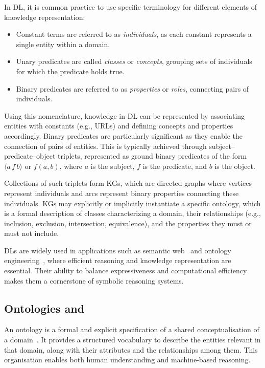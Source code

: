 In \gls{DL}, it is common practice to use specific terminology for different elements of knowledge representation:
%
\begin{itemize}
    \item Constant terms are referred to as \textit{individuals}, as each constant represents a single entity within a domain.
    \item Unary predicates are called \textit{classes} or \textit{concepts}, grouping sets of individuals for which the predicate holds true.
    \item Binary predicates are referred to as \textit{properties} or \textit{roles}, connecting pairs of individuals.
\end{itemize}
%

Using this nomenclature, knowledge in \gls{DL} can be represented by associating entities with constants (e.g., URLs) and defining concepts and properties accordingly.
%
Binary predicates are particularly significant as they enable the connection of pairs of entities.
%
This is typically achieved through subject–predicate–object triplets, represented as ground binary predicates of the form \(\langle a \, f \, b\rangle\) or \(f(a, b)\), where \(a\) is the subject, \(f\) is the predicate, and \(b\) is the object.

Collections of such triplets form \glspl{KG}, which are directed graphs where vertices represent individuals and arcs represent binary properties connecting these individuals.
%
\glspl{KG} may explicitly or implicitly instantiate a specific \gls{ontology}, which is a formal description of classes characterizing a domain, their relationships (e.g., inclusion, exclusion, intersection, equivalence), and the properties they must or must not include.


\glspl{DL} are widely used in applications such as semantic web~\cite{DBLP:conf/coopis/GangemiM03} and ontology engineering~\cite{DBLP:books/ios/HGJKP2016}, where efficient reasoning and knowledge representation are essential.
%
Their ability to balance expressiveness and computational efficiency makes them a cornerstone of symbolic reasoning systems.


\subsection{Ontologies and }\label{subsec:ontologies-and-kg}
%
An ontology is a formal and explicit specification of a shared conceptualisation of a domain~\cite{DBLP:books/daglib/p/Grimm10}.
%
It provides a structured vocabulary to describe the entities relevant in that domain, along with their attributes and the relationships among them.
%
This organisation enables both human understanding and machine-based reasoning.

